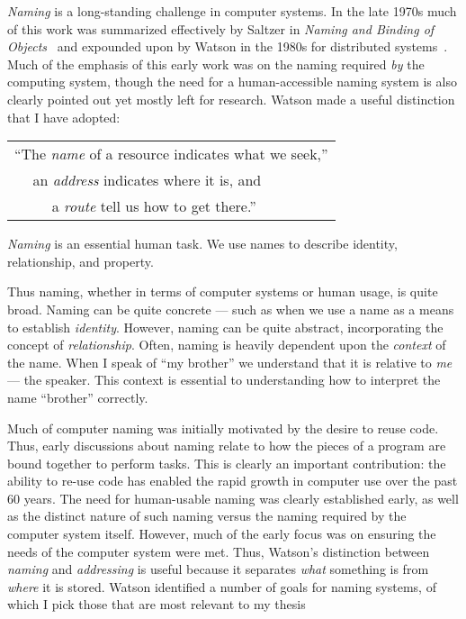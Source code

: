 \emph{Naming} is a long-standing challenge in computer systems.  In the late
1970s much of this work was summarized effectively by Saltzer in \emph{Naming
    and Binding of Objects}~\cite{Saltzer1978} and expounded upon by Watson
in the 1980s for distributed systems~\cite{watson1981identifiers}.  Much of the
emphasis of this
early work was on the naming required \emph{by} the computing system, though the
need for a human-accessible naming system is also clearly pointed out yet mostly
left for research.  Watson made a useful distinction that I have adopted:

\vspace{0.5cm}

\begin{tabular}{p{1.8cm}p{2cm}l}
    \multicolumn{3}{l}{``The \emph{name} of a resource indicates what we
    seek,''}                                                                                                         \\
     & \multicolumn{2}{l}{an \emph{address} indicates where it is, and}                                              \\
     &                                                                  & a \emph{route} tell us how to get there.''
\end{tabular}

\vspace{0.5cm}

\emph{Naming} is an essential human task.  We use names to
describe identity, relationship, and property.

Thus naming, whether in terms of computer systems or human usage, is quite
broad. Naming can be quite concrete --- such as when we
use a name as a means to establish \emph{identity}.  However, naming can be quite
abstract, incorporating the concept of \emph{relationship}.  Often, naming is
heavily dependent upon the \emph{context} of the name.  When I speak of ``my
brother'' we understand that it is relative to \emph{me} --- the speaker.  This
context is essential to understanding how to interpret the name ``brother''
correctly.

Much of computer naming was initially motivated by the desire to reuse code.
Thus, early discussions about naming relate to how the pieces of a program are
bound together to perform tasks.  This is clearly an important contribution: the
ability to re-use code has enabled the rapid growth in computer use over the
past 60 years. The need for human-usable naming was clearly established early,
as well as the distinct nature of such naming versus the naming required by the
computer system itself.  However, much of the early focus was on ensuring the
needs of the computer system were met.  Thus, Watson's distinction between
\emph{naming} and \emph{addressing} is useful because it separates \emph{what}
something is from \emph{where} it is stored.  Watson identified a number of
goals for naming systems, of which I pick those that are most relevant to my
thesis

